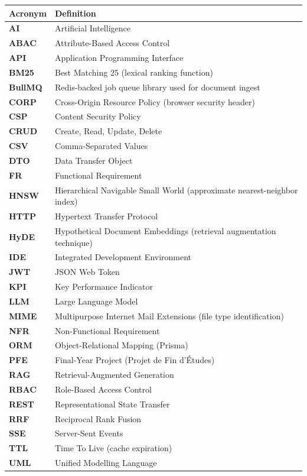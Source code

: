 {}

\vspace{0.4\baselineskip}

\begingroup
\setlength{\parskip}{0pt}
\footnotesize
\renewcommand{\arraystretch}{1.08}
\noindent
\begin{tabular}{@{}>{\bfseries}p{2.1cm}@{\hspace{0.6em}}p{12.3cm}@{}}
\hline
Acronym & Definition \\
\hline
AI & Artificial Intelligence \\
ABAC & Attribute-Based Access Control \\
API & Application Programming Interface \\
BM25 & Best Matching 25 (lexical ranking function) \\
BullMQ & Redis-backed job queue library used for document ingest \\
CORP & Cross-Origin Resource Policy (browser security header) \\
CSP & Content Security Policy \\
CRUD & Create, Read, Update, Delete \\
CSV & Comma-Separated Values \\
DTO & Data Transfer Object \\
FR & Functional Requirement \\
HNSW & Hierarchical Navigable Small World (approximate nearest-neighbor index) \\
HTTP & Hypertext Transfer Protocol \\
HyDE & Hypothetical Document Embeddings (retrieval augmentation technique) \\
IDE & Integrated Development Environment \\
JWT & JSON Web Token \\
KPI & Key Performance Indicator \\
LLM & Large Language Model \\
MIME & Multipurpose Internet Mail Extensions (file type identification) \\
NFR & Non-Functional Requirement \\
ORM & Object-Relational Mapping (Prisma) \\
PFE & Final-Year Project (Projet de Fin d'\'Etudes) \\
RAG & Retrieval-Augmented Generation \\
RBAC & Role-Based Access Control \\
REST & Representational State Transfer \\
RRF & Reciprocal Rank Fusion \\
SSE & Server-Sent Events \\
TTL & Time To Live (cache expiration) \\
UML & Unified Modelling Language \\
\hline
\end{tabular}
\endgroup
